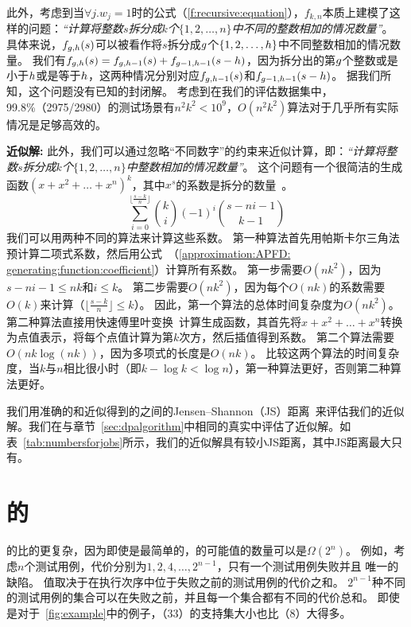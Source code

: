 此外，考虑到当$\forall j.w_j=1$时的公式（\ref{f:recursive:equation}），$f_{k,n}$本质上建模了这样的问题：\emph{“计算将整数$s$拆分成$k$个$\{1,2,\ldots,n\}$中不同的整数相加的情况数量”}。
具体来说，$f_{g,h}(s)$可以被看作将$s$拆分成$g$个$\{1,2,\ldots,h\}$中不同整数相加的情况数量。
我们有$f_{g,h}(s)=f_{g,h-1}(s)+f_{g-1,h-1}(s-h)$，因为拆分出的第$g$个整数或是小于$h$或是等于$h$，这两种情况分别对应$f_{g,h-1}(s)$和$f_{g-1,h-1}(s-h)$。
据我们所知，这个问题没有已知的封闭解。
考虑到在我们的评估数据集中，99.8\%（2975/2980）的测试场景有$n^2k^2< 10^9$，$O(n^2k^2)$算法对于几乎所有实际情况是足够高效的。

\noindent\textbf{近似解:} 此外，我们可以通过忽略“不同数字”的约束来近似计算\distribution{}，即：\emph{“计算将整数$s$拆分成$k$个$\{1,2,\ldots,n\}$中整数相加的情况数量”}。
这个问题有一个很简洁的生成函数$(x+x^2+\ldots+x^n)^k$，其中$x^s$的系数是拆分的数量~\cite{stanley2011enumerative}。
\begin{equation}\label{approximation:APFD:generating:function:coefficient}
    \sum_{i=0}^{\lfloor \frac{s-k}{n}\rfloor}\binom{k}{i}(-1)^i\binom{s-ni-1}{k-1}
\end{equation}
我们可以用两种不同的算法来计算这些系数。
第一种算法首先用帕斯卡尔三角法预计算二项式系数，然后用公式~（\ref{approximation:APFD: generating:function:coefficient}）计算所有系数。
第一步需要$O(nk^2)$，因为$s-ni-1\le nk$和$i\le k$。
第二步需要$O(nk^2)$，因为每个$O(nk)$的系数需要$O(k)$来计算（$\lfloor\frac{s-k}{n}\rfloor\le k$）。
因此，第一个算法的总体时间复杂度为$O(nk^2)$。
第二种算法直接用快速傅里叶变换~\cite{brigham1988fast}计算生成函数，其首先将$x+x^2+\ldots+x^n$转换为点值表示，将每个点值计算为第$k$次方，然后插值得到系数。
第二个算法需要$O(nk\log(nk))$，因为多项式的长度是$O(nk)$。
比较这两个算法的时间复杂度，当$k$与$n$相比很小时（即$k-\log k<\log n$），第一种算法更好，否则第二种算法更好。

我们用准确的\distribution{}和近似得到的\distribution{}之间的Jensen–Shannon（JS）距离~\cite{endres2003new}来评估我们的近似解。我们在与章节~\ref{sec:dpalgorithm}中相同的真实\job{}中评估了近似解。如表~\ref{tab:numbersforjobs}所示，我们的近似解具有较小JS距离，其中JS距离最大只有。

\section{\APFDc{}的\Distribution{}}

\APFDc{}的\distribution{}比\APFD{}的\distribution{}更复杂，因为即使是最简单的\mappingAllToOne{}\mappingMatrix{}，\APFDc{}的可能值的数量可以是$\Omega(2^n)$。
例如，考虑$n$个测试用例，代价分别为$1,2,4,\ldots,2^{n-1}$，只有一个测试用例失败并且 \detects{}唯一的缺陷。
 \APFDc{}值取决于在执行次序中位于失败之前的测试用例的代价之和。
$2^{n-1}$种不同的测试用例的集合可以在失败之前，并且每一个集合都有不同的代价总和。
即使是对于\Figure~\ref{fig:example}中的例子，\APFDc{}（33）的支持集大小也比\APFD{}（8）大得多。
